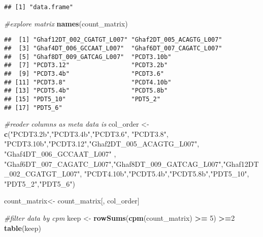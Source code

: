 \documentclass[]{article}
\newenvironment{Shaded}{\begin{snugshade}}{\end{snugshade}}
\newcommand{\CommentTok}[1]{\textcolor[rgb]{0.56,0.35,0.01}{\textit{#1}}}
\newcommand{\DecValTok}[1]{\textcolor[rgb]{0.00,0.00,0.81}{#1}}
\newcommand{\KeywordTok}[1]{\textcolor[rgb]{0.13,0.29,0.53}{\textbf{#1}}}
\newcommand{\NormalTok}[1]{#1}
\newcommand{\OperatorTok}[1]{\textcolor[rgb]{0.81,0.36,0.00}{\textbf{#1}}}
\newcommand{\StringTok}[1]{\textcolor[rgb]{0.31,0.60,0.02}{#1}}
\begin{document}
\begin{verbatim}
## [1] "data.frame"
\end{verbatim}

\begin{Shaded}
\begin{Highlighting}[]
\CommentTok{#explore matrix}
\KeywordTok{names}\NormalTok{(count_matrix)}
\end{Highlighting}
\end{Shaded}

\begin{verbatim}
##  [1] "Ghaf12DT_002_CGATGT_L007" "Ghaf2DT_005_ACAGTG_L007" 
##  [3] "Ghaf4DT_006_GCCAAT_L007"  "Ghaf6DT_007_CAGATC_L007" 
##  [5] "Ghaf8DT_009_GATCAG_L007"  "PCDT3.10b"               
##  [7] "PCDT3.12"                 "PCDT3.2b"                
##  [9] "PCDT3.4b"                 "PCDT3.6"                 
## [11] "PCDT3.8"                  "PCDT4.10b"               
## [13] "PCDT5.4b"                 "PCDT5.8b"                
## [15] "PDT5_10"                  "PDT5_2"                  
## [17] "PDT5_6"
\end{verbatim}

\begin{Shaded}
\begin{Highlighting}[]
\CommentTok{#reoder columns as meta data is }
\NormalTok{col_order <-}\StringTok{ }\KeywordTok{c}\NormalTok{(}\StringTok{"PCDT3.2b"}\NormalTok{,}\StringTok{"PCDT3.4b"}\NormalTok{,}\StringTok{"PCDT3.6"}\NormalTok{, }\StringTok{"PCDT3.8"}\NormalTok{,                     }
               \StringTok{"PCDT3.10b"}\NormalTok{,}\StringTok{"PCDT3.12"}\NormalTok{,}\StringTok{"Ghaf2DT_005_ACAGTG_L007"}\NormalTok{, }\StringTok{"Ghaf4DT_006_GCCAAT_L007"}\NormalTok{ ,     }
               \StringTok{"Ghaf6DT_007_CAGATC_L007"}\NormalTok{,}\StringTok{"Ghaf8DT_009_GATCAG_L007"}\NormalTok{,}\StringTok{"Ghaf12DT_002_CGATGT_L007"}\NormalTok{,     }
               \StringTok{"PCDT4.10b"}\NormalTok{,}\StringTok{"PCDT5.4b"}\NormalTok{,}\StringTok{"PCDT5.8b"}\NormalTok{,}\StringTok{"PDT5_10"}\NormalTok{, }\StringTok{"PDT5_2"}\NormalTok{,}\StringTok{"PDT5_6"}\NormalTok{)}

\NormalTok{count_matrix<-}\StringTok{ }\NormalTok{count_matrix[, col_order]}

\CommentTok{#filter data by cpm}
\NormalTok{keep <-}\StringTok{ }\KeywordTok{rowSums}\NormalTok{(}\KeywordTok{cpm}\NormalTok{(count_matrix) }\OperatorTok{>=}\StringTok{ }\DecValTok{5}\NormalTok{) }\OperatorTok{>=}\DecValTok{2}
\KeywordTok{table}\NormalTok{(keep)}
\end{Highlighting}
\end{Shaded}
\end{document}

